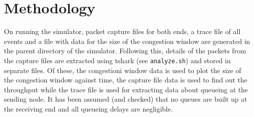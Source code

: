 \documentclass[a4paper]{article}
\begin{document}
  \section*{Methodology}
  On running the simulator, packet capture files for both ends, a trace file of all events and a file with data for the size of the congestion window are generated in the parent directory of the simulator. Following this, details of the packets from the capture files are extracted using tshark (see \texttt{analyze.sh}) and stored in separate files. Of these, the congestioni window data is used to plot the size of the congestion window against time, the capture file data is used to find out the throughput while the trace file is used for extracting data about queueing at the sending node. It has been assumed (and checked) that no queues are built up at the receiving end and all queueing delays are negligible.
    
\end{document}
